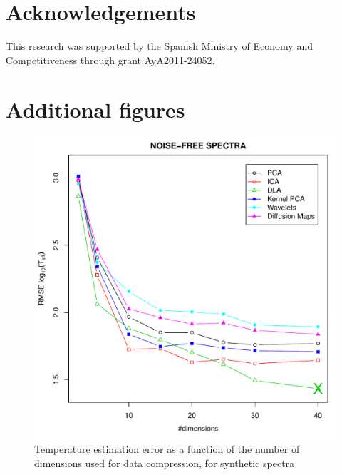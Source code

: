 \documentclass[a4paper,fleqn,usenatbib]{mnras}
\begin{document}
{{{\section*{Acknowledgements}
This research was supported by the Spanish Ministry of Economy and
Competitiveness through grant AyA2011-24052.










\appendix

\section{Additional figures}
\label{app}
\begin{figure}
\centering\includegraphics[width=\columnwidth]{flamesHR10_SNR=000_Teff_log_BestSVM_N-RMSE_test.pdf}
\caption{Temperature estimation error as a function of the number of
  dimensions used for data compression, for synthetic spectra}
\label{fig:01}
\end{figure}


}}}
\end{document}
